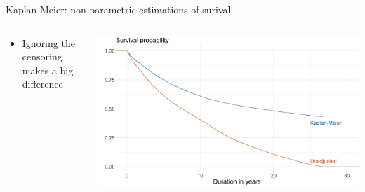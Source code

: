 \documentclass[notes,11pt, aspectratio=169]{beamer}
\begin{document}
\begin{frame}{Kaplan-Meier: non-parametric estimations of surival}
  \begin{columns}[T] %
    \begin{column}{0.3\textwidth}
      \begin{itemize}
      \item Ignoring the censoring makes a big difference  
      \end{itemize}
    \end{column}%
  \hfill%
  \begin{column}{.7\textwidth}
    \includegraphics[width=\linewidth]{images/housing_duration_full_naive_survival_v_KM.png}
  \end{column}
\end{columns}
\end{frame}
\end{document}
